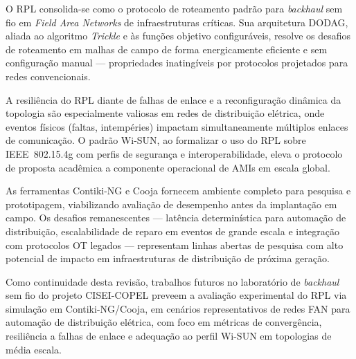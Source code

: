 \documentclass[conference]{IEEEtran}
\begin{document}
O RPL consolida-se como o protocolo de roteamento padrão para \textit{backhaul} sem fio
em \textit{Field Area Networks} de infraestruturas críticas. Sua arquitetura DODAG, aliada
ao algoritmo \textit{Trickle} e às funções objetivo configuráveis, resolve os desafios de
roteamento em malhas de campo de forma energicamente eficiente e sem configuração
manual --- propriedades inatingíveis por protocolos projetados para redes
convencionais.

A resiliência do RPL diante de falhas de enlace e a reconfiguração dinâmica da
topologia são especialmente valiosas em redes de distribuição elétrica, onde
eventos físicos (faltas, intempéries) impactam simultaneamente múltiplos enlaces
de comunicação. O padrão Wi-SUN, ao formalizar o uso do RPL sobre IEEE~802.15.4g
com perfis de segurança e interoperabilidade, eleva o protocolo de proposta
acadêmica a componente operacional de AMIs em escala global.

As ferramentas Contiki-NG e Cooja fornecem ambiente completo para pesquisa e
prototipagem, viabilizando avaliação de desempenho antes da implantação em campo.
Os desafios remanescentes --- latência determinística para automação de
distribuição, escalabilidade de reparo em eventos de grande escala e integração
com protocolos OT legados --- representam linhas abertas de pesquisa com alto
potencial de impacto em infraestruturas de distribuição de próxima geração.

Como continuidade desta revisão, trabalhos futuros no laboratório de \textit{backhaul} sem
fio do projeto CISEI-COPEL preveem a avaliação experimental do RPL via simulação
em Contiki-NG/Cooja, em cenários representativos de redes FAN para automação de
distribuição elétrica, com foco em métricas de convergência, resiliência a falhas
de enlace e adequação ao perfil Wi-SUN em topologias de média escala.



\end{document}
